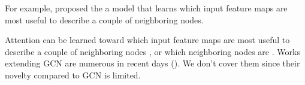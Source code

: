 For example, \cite{velickovic2017graph} proposed the  a model that learns which input feature maps are most useful to describe a couple of neighboring nodes.

\todo{}


Attention can be learned toward which input feature maps are most useful to describe a couple of neighboring nodes \citep{velickovic2017graph}, or which neighboring nodes are \citep{lee2018attention}. Works extending GCN are numerous in recent days (\eg \cite{niepert2018towards}). We don't cover them since their novelty compared to GCN is limited.

